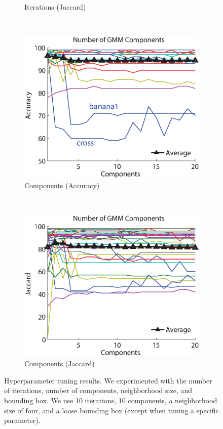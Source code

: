\documentclass[10pt,twocolumn,letterpaper]{article}
\begin{document}
\begin{figure}[t]
\begin{subfigure}[b]{0.24\textwidth}
    \caption{Iterations (Jaccard)}
    \label{fig:iterations_jaccard}
\end{subfigure}%
~
\begin{subfigure}[b]{0.24\textwidth}
    \includegraphics[width=\textwidth]{figures/experiments/tuning/components_accuracy.eps}
    \caption{Components (Accuracy)}
    \label{fig:components_accuracy}
\end{subfigure}%
~
\begin{subfigure}[b]{0.24\textwidth}
    \includegraphics[width=\textwidth]{figures/experiments/tuning/components_jaccard.eps}
    \caption{Components (Jaccard)}
    \label{fig:components_jaccard}
\end{subfigure}
\caption{Hyperparameter tuning results. We experimented with the number of iterations, number of components, neighborhood size, and bounding box. We use 10 iterations, 10 components, a neighborhood size of four, and a loose bounding box (except when tuning a specific parameter).}
\end{figure}
\end{document}
